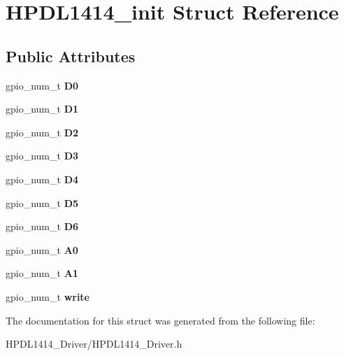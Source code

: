 \hypertarget{structHPDL1414__init}{}\section{H\+P\+D\+L1414\+\_\+init Struct Reference}
\label{structHPDL1414__init}
\subsection*{Public Attributes}
\begin{DoxyCompactItemize}
\item 
\mbox{\label{structHPDL1414__init_a2a6ecc27867895cfc9160162f7084586}} 
gpio\+\_\+num\+\_\+t {\bfseries D0}
\item 
\mbox{\label{structHPDL1414__init_aa6747a659bf3ae45f0cabab8c9759722}} 
gpio\+\_\+num\+\_\+t {\bfseries D1}
\item 
\mbox{\label{structHPDL1414__init_a1434f9dbc8d7f503d016d85e8a3b97d3}} 
gpio\+\_\+num\+\_\+t {\bfseries D2}
\item 
\mbox{\label{structHPDL1414__init_ac073d5bffb504176dfc99efbc328f821}} 
gpio\+\_\+num\+\_\+t {\bfseries D3}
\item 
\mbox{\label{structHPDL1414__init_a37b836a1045674064991fd65359096a6}} 
gpio\+\_\+num\+\_\+t {\bfseries D4}
\item 
\mbox{\label{structHPDL1414__init_a85abdfaefe933b96d8e6fe7ebec55789}} 
gpio\+\_\+num\+\_\+t {\bfseries D5}
\item 
\mbox{\label{structHPDL1414__init_a0531fa643f6fe8c91bb5d95500d1898b}} 
gpio\+\_\+num\+\_\+t {\bfseries D6}
\item 
\mbox{\label{structHPDL1414__init_a7eb1aae8684305fc97a07dc83c8f7e6b}} 
gpio\+\_\+num\+\_\+t {\bfseries A0}
\item 
\mbox{\label{structHPDL1414__init_a18841e99a8598cf317ab25b2f38cf6b9}} 
gpio\+\_\+num\+\_\+t {\bfseries A1}
\item 
\mbox{\label{structHPDL1414__init_a9518004a4d3319a7a0eefe089e75a412}} 
gpio\+\_\+num\+\_\+t {\bfseries write}
\end{DoxyCompactItemize}


The documentation for this struct was generated from the following file\+:\begin{DoxyCompactItemize}
\item 
H\+P\+D\+L1414\+\_\+\+Driver/H\+P\+D\+L1414\+\_\+\+Driver.\+h\end{DoxyCompactItemize}

